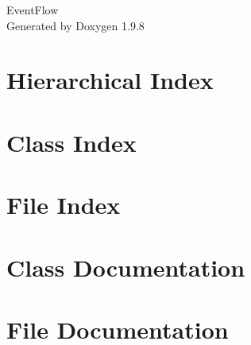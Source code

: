 \documentclass[twoside]{book}
\newcommand{\+}{\discretionary{\mbox{\scriptsize$\hookleftarrow$}}{}{}}
\newcommand{\clearemptydoublepage}{%
    \newpage{\pagestyle{empty}\cleardoublepage}%
  }
\begin{document}
  \raggedbottom
    \hypersetup{pageanchor=false,
                bookmarksnumbered=true,
                pdfencoding=unicode
               }
  \begin{titlepage}
  \vspace*{7cm}
  \begin{center}%
  {\Large Event\+Flow}\\
  \vspace*{1cm}
  {\large Generated by Doxygen 1.9.8}\\
  \end{center}
  \end{titlepage}
  \clearemptydoublepage
  \tableofcontents
  \clearemptydoublepage
  \hypersetup{pageanchor=true}

\chapter{Hierarchical Index}

\chapter{Class Index}

\chapter{File Index}

\chapter{Class Documentation}














\chapter{File Documentation}












  \backmatter
  \newpage
  \clearemptydoublepage
  \printindex
\end{document}
